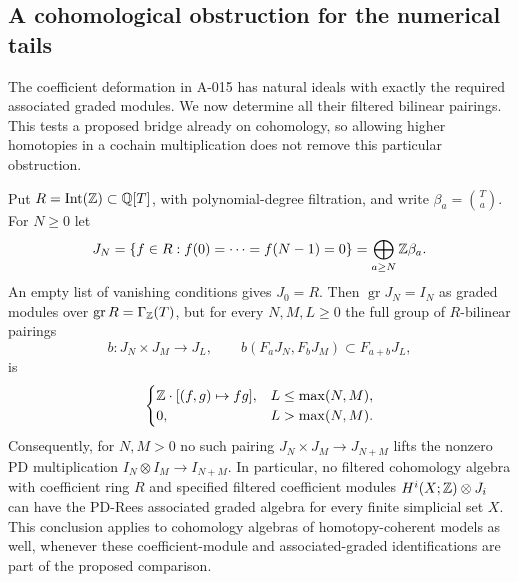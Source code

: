 \subsection{A cohomological obstruction for the numerical tails}

The coefficient deformation in A-015 has natural ideals with exactly
the required associated graded modules. We now determine all their
filtered bilinear pairings. This tests a proposed bridge already on
cohomology, so allowing higher homotopies in a cochain multiplication
does not remove this particular obstruction.

\begin{theorem}
\label{sa08:A023}
Put $R=\operatorname{Int}(\mathbb Z)\subset\mathbb Q[T]$, with polynomial-degree
filtration, and write $\beta_a=\binom{T}{a}$. For $N\geq0$ let
\[
 J_N=\{f\in R:f(0)=\cdots=f(N-1)=0\}
     =\bigoplus_{a\geq N}\mathbb Z\beta_a.
\]
An empty list of vanishing conditions gives $J_0=R$.
Then $\operatorname{gr}J_N=I_N$ as graded modules over
$\operatorname{gr}R=\Gamma_{\mathbb Z}(T)$, but for every $N,M,L\geq0$
the full group of $R$-bilinear pairings
\[
 b:J_N\times J_M\longrightarrow J_L,
 \qquad b(F_aJ_N,F_bJ_M)\subset F_{a+b}J_L,
\]
is
\[
 \begin{cases}
  \mathbb Z\cdot[(f,g)\mapsto fg],&L\leq\max(N,M),\\
  0,&L>\max(N,M).
 \end{cases}
\]
Consequently, for $N,M>0$ no such pairing
$J_N\times J_M\to J_{N+M}$ lifts the nonzero PD multiplication
$I_N\otimes I_M\to I_{N+M}$.
In particular, no filtered cohomology algebra with coefficient ring
$R$ and specified filtered coefficient modules
$H^i(X;\mathbb Z)\otimes J_i$ can have the PD-Rees associated graded
algebra for every finite simplicial set $X$. This conclusion applies
to cohomology algebras of homotopy-coherent models as well, whenever
these coefficient-module and associated-graded identifications are
part of the proposed comparison.
\end{theorem}

